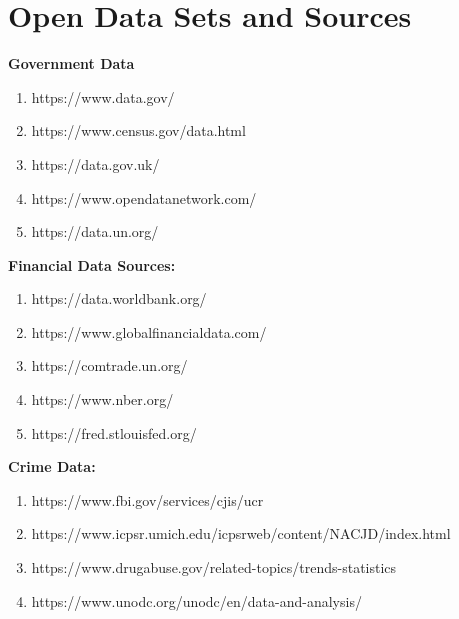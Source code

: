 \documentclass{article}
\begin{document}
\newpage

\section{Open Data Sets and Sources}

\textbf{Government Data}

 


\begin{enumerate} 
    \item https://www.data.gov/
    \item https://www.census.gov/data.html
    \item https://data.gov.uk/
    \item https://www.opendatanetwork.com/
    \item https://data.un.org/
\end{enumerate}
 
\textbf{Financial Data Sources:}

\begin{enumerate} 
    \item https://data.worldbank.org/
    \item https://www.globalfinancialdata.com/
    \item https://comtrade.un.org/
    \item https://www.nber.org/
    \item https://fred.stlouisfed.org/ 
\end{enumerate}
 
\textbf{Crime Data:}
\begin{enumerate} 
    \item https://www.fbi.gov/services/cjis/ucr
    \item https://www.icpsr.umich.edu/icpsrweb/content/NACJD/index.html
    \item https://www.drugabuse.gov/related-topics/trends-statistics
    \item https://www.unodc.org/unodc/en/data-and-analysis/
\end{enumerate}
\end{document}
